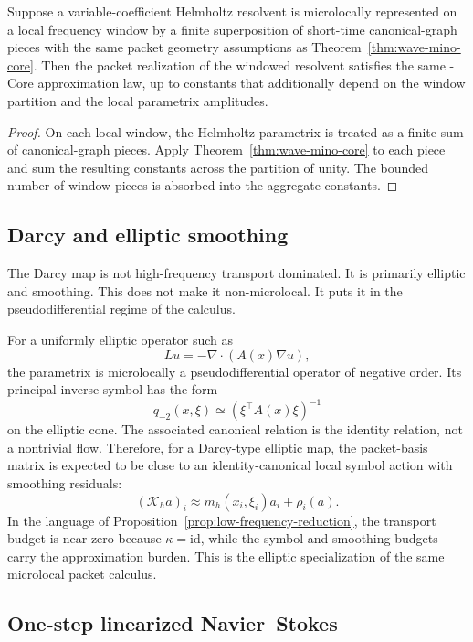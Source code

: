 \begin{corollary}
\label{cor:helmholtz-window}
Suppose a variable-coefficient Helmholtz resolvent is microlocally represented on a local frequency window by a finite superposition of short-time canonical-graph pieces with the same packet geometry assumptions as Theorem~\ref{thm:wave-mino-core}. Then the packet realization of the windowed resolvent satisfies the same \MiNO-Core approximation law, up to constants that additionally depend on the window partition and the local parametrix amplitudes.
\end{corollary}

\begin{proof}
On each local window, the Helmholtz parametrix is treated as a finite sum of canonical-graph pieces. Apply Theorem~\ref{thm:wave-mino-core} to each piece and sum the resulting constants across the partition of unity. The bounded number of window pieces is absorbed into the aggregate constants.
\end{proof}

\subsection{Darcy and elliptic smoothing}

The Darcy map is not high-frequency transport dominated. It is primarily elliptic and smoothing. This does not make it non-microlocal. It puts it in the pseudodifferential regime of the calculus.

For a uniformly elliptic operator such as
\[
Lu=-\nabla\cdot(A(x)\nabla u),
\]
the parametrix is microlocally a pseudodifferential operator of negative order. Its principal inverse symbol has the form
\[
q_{-2}(x,\xi)\simeq (\xi^\top A(x)\xi)^{-1}
\]
on the elliptic cone. The associated canonical relation is the identity relation, not a nontrivial flow. Therefore, for a Darcy-type elliptic map, the packet-basis matrix is expected to be close to an identity-canonical local symbol action with smoothing residuals:
\[
(\mathcal K_h a)_i \approx m_h(x_i,\xi_i)a_i+\rho_i(a).
\]
In the language of Proposition~\ref{prop:low-frequency-reduction}, the transport budget is near zero because $\kappa=\mathrm{id}$, while the symbol and smoothing budgets carry the approximation burden. This is the elliptic specialization of the same microlocal packet calculus.

\subsection{One-step linearized Navier--Stokes}

